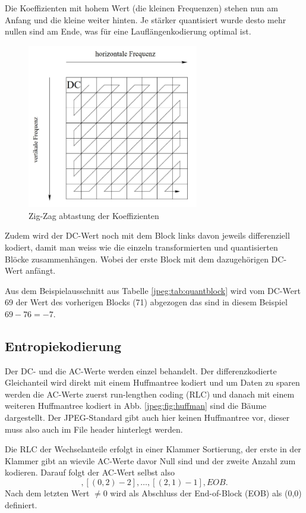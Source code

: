 Die Koeffizienten mit hohem Wert (die kleinen Frequenzen) stehen nun am Anfang und die kleine weiter hinten.
Je stärker quantisiert wurde desto mehr nullen sind am Ende, was für eine Lauflängenkodierung optimal ist.

\begin{figure}
    \centering
    \includegraphics[width=75mm]{papers/jpeg/pictures/zigzag.pdf}
    \caption{Zig-Zag abtastung der Koeffizienten
        \label{jpeg:fig:zigzag}}
\end{figure}

Zudem wird der DC-Wert noch mit dem Block links davon jeweils differenziell kodiert, damit man weiss wie die einzeln transformierten und quantisierten Blöcke zusammenhängen.
Wobei der erste Block mit dem dazugehörigen DC-Wert anfängt.

Aus dem Beispielausschnitt aus Tabelle \ref{jpeg:tab:quantblock} wird vom DC-Wert 69 der Wert des vorherigen Blocks (71) abgezogen das sind in diesem Beispiel \(69-76 = -7\).

\subsection{Entropiekodierung
\label{jpeg:subsection:entropiekodierung}}
Der DC- und die AC-Werte werden einzel behandelt.
Der differenzkodierte Gleichanteil wird direkt mit einem Huffmantree kodiert und um Daten zu sparen werden die AC-Werte zuerst run-lengthen coding (RLC) und danach mit einem weiteren Huffmantree kodiert in Abb. \ref{jpeg:fig:huffman} sind die Bäume dargestellt.
Der JPEG-Standard gibt auch hier keinen Huffmantree vor, dieser muss also auch im File header hinterlegt werden.

Die RLC der Wechselanteile erfolgt in einer Klammer Sortierung, der erste in der Klammer gibt an wievile AC-Werte davor Null sind und der zweite Anzahl zum kodieren.
Darauf folgt der AC-Wert selbst also 
\begin{equation}
    [(0,3)5],[(0,2)-2], \dots, [(2,1)-1], EOB.
\end{equation}
Nach dem letzten Wert \(\neq 0\) wird als Abschluss der End-of-Block (EOB) als (0,0) definiert.

